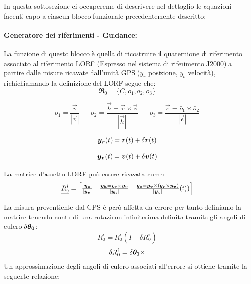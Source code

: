 In questa sottosezione ci occuperemo di descrivere nel dettaglio le equazioni
facenti capo a ciascun blocco funzionale precedentemente descritto:
\paragraph{ Generatore dei riferimenti - Guidance:}
La funzione di questo blocco è quella di ricostruire il quaternione di
riferimento associato al riferimento LORF (Espresso nel sistema di riferimento
J2000) a partire dalle misure ricavate dall'unità GPS ($y_r$ posizione, $y_v$
velocità), richichiamando la definizione del LORF segue che:
\begin{equation}
	\mathfrak{R_0} = \{C,\bar{o}_1,\bar{o}_2,\bar{o}_3\}
\end{equation}

\begin{equation}
\bar{o}_1 = \frac{\vec{v}}{|\vec{v}|} \hspace{20pt}%
\bar{o}_2 = \frac{\vec{h}=\vec{r} \times \vec{v}}{|\vec{h}|} \hspace{20pt}%
\bar{o}_3 = \frac{\vec{e}=\bar{o}_1 \times \bar{o}_2}{|\vec{e}|}
\end{equation}

\begin{equation}
	\boldsymbol{y_r}(t) = \boldsymbol{r}(t) + \delta \boldsymbol{r}(t)
\end{equation}

\begin{equation}
	\boldsymbol{y_v}(t) = \boldsymbol{v}(t) + \delta \boldsymbol{v}(t)
\end{equation}

La matrice d'assetto LORF può essere ricavata come:
\begin{equation}
\underline{R_{0}^{i}}=
\begin{bmatrix}
	\frac{\boldsymbol{y_v}}{|\boldsymbol{y_v}|} &
	\frac{\boldsymbol{y_h}=\boldsymbol{y_r}	\times \boldsymbol{y_v}}{|\boldsymbol{y_h}|} &
	\frac{\boldsymbol{y_e}=\boldsymbol{y_v} \times (\boldsymbol{y_r}\times\boldsymbol{y_v})}{|\boldsymbol{y_v}|}(t))
\end{bmatrix}
\end{equation}

La misura proventiente dal GPS é però affetta da errore per tanto definiamo la
matrice tenendo conto di una rotazione infinitesima definita
tramite gli angoli di eulero $\delta\boldsymbol{\theta_0}$:
\begin{equation}
R_{0}^{i}=\underline{R_{0}^{i}}(I+\delta R_{0}^{i})
\end{equation}
\begin{equation}
\delta R_{0}^{i} = \delta\boldsymbol{\theta_0} \times
\end{equation}
Un approssimazione degli angoli di eulero associati all'errore si ottiene
tramite la seguente relazione:

